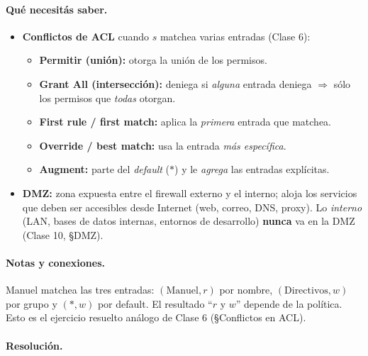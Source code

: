 \paragraph{Qué necesitás saber.}
\begin{itemize}
  \item \textbf{Conflictos de ACL} cuando $s$ matchea varias entradas (Clase 6):
    \begin{itemize}
      \item \textbf{Permitir (unión):} otorga la unión de los permisos.
      \item \textbf{Grant All (intersección):} deniega si \emph{alguna} entrada deniega
            $\Rightarrow$ sólo los permisos que \emph{todas} otorgan.
      \item \textbf{First rule / first match:} aplica la \emph{primera} entrada que matchea.
      \item \textbf{Override / best match:} usa la entrada \emph{más específica}.
      \item \textbf{Augment:} parte del \emph{default} ($\ast$) y le \emph{agrega} las
            entradas explícitas.
    \end{itemize}
  \item \textbf{DMZ:} zona expuesta entre el firewall externo y el interno; aloja los
        servicios que deben ser accesibles desde Internet (web, correo, DNS, proxy). Lo
        \emph{interno} (LAN, bases de datos internas, entornos de desarrollo) \textbf{nunca}
        va en la DMZ (Clase 10, \S DMZ).
\end{itemize}

\paragraph{Notas y conexiones.} Manuel matchea las tres entradas: $(\text{Manuel},r)$ por
nombre, $(\text{Directivos},w)$ por grupo y $(\ast,w)$ por default. El resultado ``$r$ y $w$''
depende de la política. Esto es el ejercicio resuelto análogo de Clase 6 (\S Conflictos en
ACL).

\paragraph{Resolución.}

